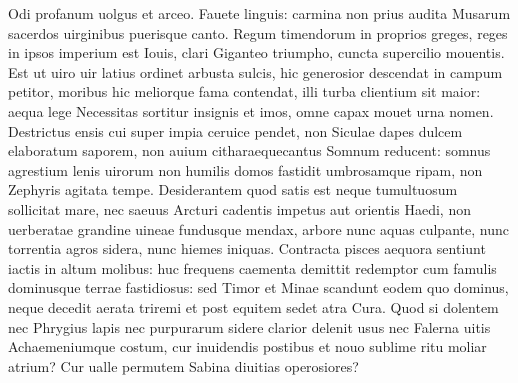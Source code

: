 \documentclass{book}
\newenvironment {carmen} [1] [\relax] 
  {\Titulus \Versus \incipit*\numerus{1}#1}
  {\endVersus}
\newcommand {\Alcaic}    {\Forma \strophae {0 \poena 01 \poena 2}}
\begin{document}
\begin{carmen}[\Alcaic]

Odi profanum uolgus et arceo.
 Fauete linguis: carmina non prius
      audita Musarum sacerdos
      uirginibus puerisque canto. 
Regum timendorum in proprios greges,               
 reges in ipsos imperium est Iouis,
      clari Giganteo triumpho,
      cuncta supercilio mouentis. 
Est ut uiro uir latius ordinet
 arbusta sulcis, hic generosior               
      descendat in campum petitor,
      moribus hic meliorque fama 
contendat, illi turba clientium
 sit maior: aequa lege Necessitas
      sortitur insignis et imos,
      omne capax mouet urna nomen.                
Destrictus ensis cui super impia
 ceruice pendet, non Siculae dapes
      dulcem elaboratum saporem,
      non auium citharaequecantus                
Somnum reducent: somnus agrestium
 lenis uirorum non humilis domos
      fastidit umbrosamque ripam,
      non Zephyris agitata tempe. 
Desiderantem quod satis est neque               
 tumultuosum sollicitat mare,
      nec saeuus Arcturi cadentis
      impetus aut orientis Haedi, 
non uerberatae grandine uineae
 fundusque mendax, arbore nunc aquas               
      culpante, nunc torrentia agros
      sidera, nunc hiemes iniquas. 
Contracta pisces aequora sentiunt
 iactis in altum molibus: huc frequens
      caementa demittit redemptor
      cum famulis dominusque terrae                
fastidiosus: sed Timor et Minae
 scandunt eodem quo dominus, neque
      decedit aerata triremi et
      post equitem sedet atra Cura.                
Quod si dolentem nec Phrygius lapis
 nec purpurarum sidere clarior
      delenit usus nec Falerna
      uitis Achaemeniumque costum, 
cur inuidendis postibus et nouo               
 sublime ritu moliar atrium?
      Cur ualle permutem Sabina
      diuitias operosiores? 

\end{carmen}
\end{document}
